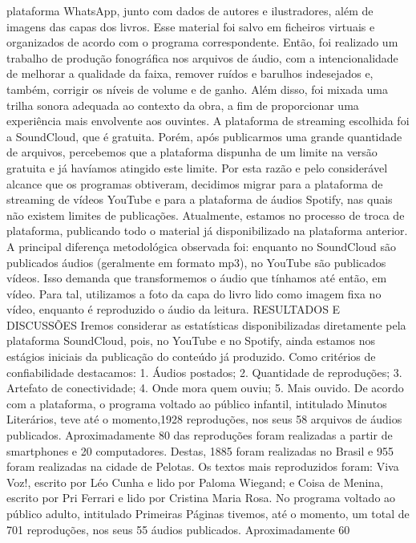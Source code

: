 plataforma WhatsApp, junto com dados de autores e ilustradores, além de imagens das capas dos 
livros. Esse material foi salvo em ficheiros virtuais e organizados de acordo com o programa 
correspondente. Então, foi realizado um trabalho de produção fonográfica nos arquivos de áudio, 
com a intencionalidade de melhorar a qualidade da faixa, remover ruídos e barulhos indesejados 
e, também, corrigir os níveis de volume e de ganho. Além disso, foi mixada uma trilha sonora 
adequada ao contexto da obra, a fim de proporcionar uma experiência mais envolvente aos 
ouvintes. A plataforma de streaming escolhida foi a SoundCloud, que é gratuita. Porém, após 
publicarmos uma grande quantidade de arquivos, percebemos que a plataforma dispunha de um 
limite na versão gratuita e já havíamos atingido este limite. Por esta razão e pelo considerável 
alcance que os programas obtiveram, decidimos migrar para a plataforma de streaming de vídeos 
YouTube e para a plataforma de áudios Spotify, nas quais não existem limites de publicações.
Atualmente, estamos no processo de troca de plataforma, publicando todo o material já 
disponibilizado na plataforma anterior. A principal diferença metodológica observada foi: 
enquanto no SoundCloud são publicados áudios (geralmente em formato mp3), no YouTube são 
publicados vídeos. Isso demanda que transformemos o áudio que tínhamos até então, em vídeo. 
Para tal, utilizamos a foto da capa do livro lido como imagem fixa no vídeo, enquanto é 
reproduzido o áudio da leitura.
RESULTADOS E DISCUSSÕES
Iremos considerar as estatísticas disponibilizadas diretamente pela plataforma 
SoundCloud, pois, no YouTube e no Spotify, ainda estamos nos estágios iniciais da publicação do 
conteúdo já produzido.
Como critérios de confiabilidade destacamos: 1. Áudios postados; 2. Quantidade de 
reproduções; 3. Artefato de conectividade; 4. Onde mora quem ouviu; 5. Mais ouvido. De acordo 
com a plataforma, o programa voltado ao público infantil, intitulado Minutos Literários, teve até 
o momento,1928 reproduções, nos seus 58 arquivos de áudios publicados. Aproximadamente 80%
das reproduções foram realizadas a partir de smartphones e 20%
computadores. Destas, 1885 foram realizadas no Brasil e 955 foram realizadas na cidade de 
Pelotas. Os textos mais reproduzidos foram: Viva Voz!, escrito por Léo Cunha e lido por Paloma 
Wiegand; e Coisa de Menina, escrito por Pri Ferrari e lido por Cristina Maria Rosa. No programa 
voltado ao público adulto, intitulado Primeiras Páginas tivemos, até o momento, um total de 701 
reproduções, nos seus 55 áudios publicados. Aproximadamente 60%
